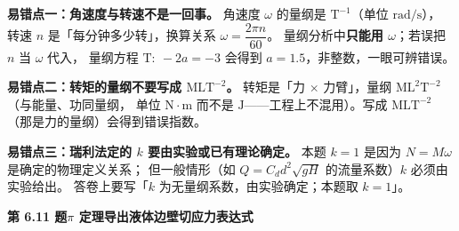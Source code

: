 \begin{yicuo}
\textbf{易错点一：角速度与转速不是一回事。}
角速度 $\omega$ 的量纲是 $\mathrm{T^{-1}}$（单位 $\mathrm{rad/s}$），
转速 $n$ 是「每分钟多少转」，换算关系 $\omega=\dfrac{2\pi n}{60}$。
量纲分析中\textbf{只能用 $\omega$}；若误把 $n$ 当 $\omega$ 代入，
量纲方程 $\mathrm{T}:\ -2a=-3$ 会得到 $a=1.5$，非整数，一眼可辨错误。

\textbf{易错点二：转矩的量纲不要写成 $\mathrm{MLT^{-2}}$。}
转矩是「力 $\times$ 力臂」，量纲 $\mathrm{ML^{2}T^{-2}}$（与能量、功同量纲，
单位 $\mathrm{N\cdot m}$ 而不是 $\mathrm{J}$——工程上不混用）。写成 $\mathrm{MLT^{-2}}$
（那是力的量纲）会得到错误指数。

\textbf{易错点三：瑞利法定的 $k$ 要由实验或已有理论确定。}
本题 $k=1$ 是因为 $N=M\omega$ 是确定的物理定义关系；
但一般情形（如 $Q=C_d d^{2}\sqrt{gH}$ 的流量系数）$k$ 必须由实验给出。
答卷上要写「$k$ 为无量纲系数，由实验确定；本题取 $k=1$」。
\end{yicuo}

\noindent\textbf{第 6.11 题\quad $\pi$ 定理导出液体边壁切应力表达式}

